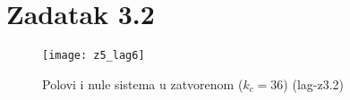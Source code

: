 \chapter{Zadatak 3.2}


\begin{figure} [H]
  \centering
  \texttt{[image: z5\_lag6]}
  \caption{Polovi i nule sistema u zatvorenom ($k_c=36$) (lag-z3.2)}
  \label{fig:z5_lag6}
\end{figure}

















